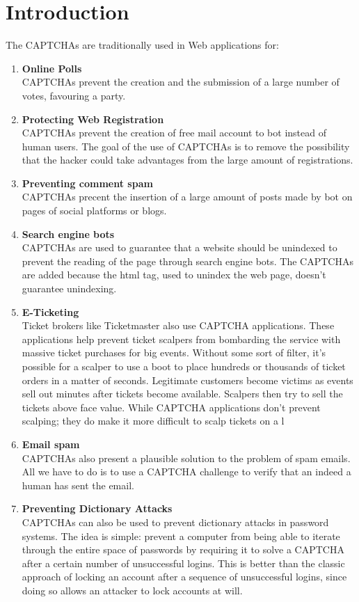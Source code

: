 \chapter{Introduction}
The CAPTCHAs are traditionally used in Web applications for:
\begin{enumerate}
\item{\textbf{Online Polls}\\
CAPTCHAs prevent the creation and the submission of a large number of votes, favouring a party.
}
\item{\textbf{Protecting Web Registration}\\
CAPTCHAs prevent the creation of free mail account to bot instead of human users. The goal of the use of CAPTCHAs is to remove the possibility that the hacker could take advantages from the large amount of registrations.
}
\item{\textbf{Preventing comment spam}\\
CAPTCHAs precent the insertion of a large amount of posts made by bot on pages of social platforms or blogs.
}
\item{\textbf{Search engine bots}\\
CAPTCHAs are used to guarantee that a website should be unindexed to prevent the reading of the page through search engine bots. The CAPTCHAs are added because the html tag, used to unindex the web page, doesn't guarantee unindexing.}
\item{\textbf{E-Ticketing}\\
Ticket brokers like Ticketmaster also use CAPTCHA applications. These applications help prevent ticket scalpers from bombarding the service with massive ticket purchases for big events. Without some sort of filter, it's possible for a scalper to use a boot to place hundreds or thousands of ticket orders in a matter of seconds. Legitimate customers become victims as events sell out minutes after tickets become available. Scalpers then try to sell the tickets above face value. While CAPTCHA applications don't prevent scalping; they do make it more difficult to scalp tickets on a l
}
\item{\textbf{Email spam}\\
CAPTCHAs also present a plausible solution to the problem of spam emails. All we have to do is to use a CAPTCHA challenge to verify that an indeed a human has sent the email.
}
\item{\textbf{Preventing Dictionary Attacks}\\
CAPTCHAs can also be used to prevent dictionary attacks in password systems. The idea is simple: prevent a computer from being able to iterate through the entire space of passwords by requiring it to solve a CAPTCHA after a certain number of unsuccessful logins. This is better than the classic approach of locking an account after a sequence of unsuccessful logins, since doing so allows an attacker to lock accounts at will.
}
\end{enumerate}
